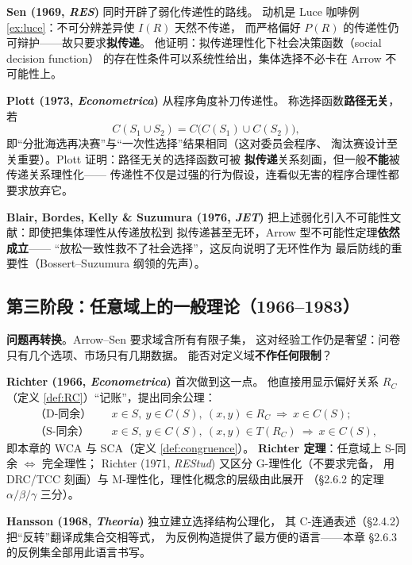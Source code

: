 \textbf{Sen (1969, \emph{RES})} 同时开辟了弱化传递性的路线。
动机是 Luce 咖啡例 \ref{ex:luce}：不可分辨差异使 $I(R)$ 天然不传递，
而严格偏好 $P(R)$ 的传递性仍可辩护——故只要求\textbf{拟传递}。
他证明：拟传递理性化下社会决策函数（social decision function）
的存在性条件可以系统性给出，集体选择不必卡在 Arrow 不可能性上。

\textbf{Plott (1973, \emph{Econometrica})} 从程序角度补刀传递性。
称选择函数\textbf{路径无关}，若
\begin{equation}
C(S_1\cup S_2)=C\bigl(C(S_1)\cup C(S_2)\bigr),
\label{eq:pathindep}
\end{equation}
即“分批海选再决赛”与“一次性选择”结果相同（这对委员会程序、
淘汰赛设计至关重要）。Plott 证明：路径无关的选择函数可被
\textbf{拟传递}关系刻画，但一般\textbf{不能}被传递关系理性化——
传递性不仅是过强的行为假设，连看似无害的程序合理性都要求放弃它。

\textbf{Blair, Bordes, Kelly \& Suzumura (1976, \emph{JET})}
把上述弱化引入不可能性文献：即使把集体理性从传递放松到
拟传递甚至无环，Arrow 型不可能性定理\textbf{依然成立}——
“放松一致性救不了社会选择”，这反向说明了无环性作为
最后防线的重要性（Bossert--Suzumura 纲领的先声）。

\subsection{第三阶段：任意域上的一般理论（1966--1983）}

\textbf{问题再转换}。Arrow--Sen 要求域含所有有限子集，
这对经验工作仍是奢望：问卷只有几个选项、市场只有几期数据。
能否对定义域\textbf{不作任何限制}？

\textbf{Richter (1966, \emph{Econometrica})} 首次做到这一点。
他直接用显示偏好关系 $R_C$（定义 \ref{def:RC}）“记账”，提出同余公理：
\begin{align}
\text{（D-同余）}\quad &x\in S,\ y\in C(S),\ (x,y)\in R_C
\ \Rightarrow\ x\in C(S);\\
\text{（S-同余）}\quad &x\in S,\ y\in C(S),\ (x,y)\in T(R_C)
\ \Rightarrow\ x\in C(S),
\end{align}
即本章的 WCA 与 SCA（定义 \ref{def:congruence}）。
\textbf{Richter 定理}：任意域上 S-同余 $\iff$ 完全理性；
Richter (1971, \emph{REStud}) 又区分 G-理性化（不要求完备，
用 DRC/TCC 刻画）与 M-理性化，理性化概念的层级由此展开
（§2.6.2 的定理 $\alpha/\beta/\gamma$ 三分）。

\textbf{Hansson (1968, \emph{Theoria})} 独立建立选择结构公理化，
其 C-连通表述（§2.4.2）把“反转”翻译成集合交相等式，
为反例构造提供了最方便的语言——本章 §2.6.3 的反例集全部用此语言书写。

